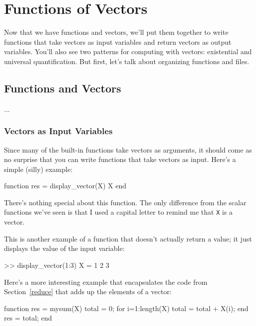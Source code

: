 \chapter{Functions of Vectors}
\minitoc

Now that we have functions and vectors, we'll put them together to write functions that take vectors as input variables and return vectors as output variables.  You'll also see two patterns for computing with vectors: existential and universal quantification.  But first, let's talk about organizing functions and files.



\section{Functions and Vectors}
...

\subsection{Vectors as Input Variables}

Since many of the built-in functions take vectors as arguments,
it should come as no surprise that you can write functions that
take vectors as input.  Here's a simple (silly) example:


\begin{code}
function res = display_vector(X)
    X
end
\end{code}

There's nothing special about this function.  The only
difference from the scalar functions we've seen is that I used
a capital letter to remind me that {\tt X} is a vector.

This is another example of a function that doesn't actually return a value; it just displays the value of the input variable:

\begin{code}
>> display_vector(1:3)
X = 1     2     3
\end{code}

Here's a more interesting example that encapsulates the code
from Section~\ref{reduce} that adds up the elements of a vector:


\begin{code}
function res = mysum(X)
    total = 0;
    for i=1:length(X)
        total = total + X(i);
    end
    res = total;
end
\end{code}

